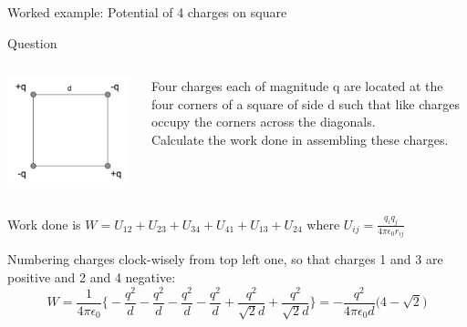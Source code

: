 {
\problemslide

%
%
%

\begin{frame}{Worked example: Potential of 4 charges on square }

\begin{blockexmplque}{Question}
\begin{columns}
  \begin{column}{0.25\textwidth}
   \begin{center}
     \includegraphics[width=0.98\textwidth]{./images/problems/lect2_array_of_4_charges.png}
   \end{center}
  \end{column}
  \begin{column}{0.75\textwidth}
     Four charges each of magnitude q are located at the four corners of a
     square of side d such that like charges occupy the corners across
     the diagonals. \\
    Calculate the work done in assembling these charges.
  \end{column}
\end{columns}
\end{blockexmplque}

\vspace{0.1cm}

Work done is
$\displaystyle W = U_{12} + U_{23} + U_{34} + U_{41} + U_{13} + U_{24}$
where $\displaystyle U_{ij} =  \frac{q_i q_j}{4\pi \epsilon_0 r_{ij}}$

Numbering charges clock-wisely from top left one,
so that charges 1 and 3 are positive and 2 and 4 negative:
\begin{equation*}
  W = \frac{1}{4\pi \epsilon_0}
    \bigg\{
        - \frac{q^2}{d} -  \frac{q^2}{d} -  \frac{q^2}{d} -  \frac{q^2}{d} +  \frac{q^2}{\sqrt{2}d} + \frac{q^2}{\sqrt{2}d}
     \bigg\} =
     -\frac{q^2}{4\pi \epsilon_0 d} \Big( 4 - \sqrt{2} \Big)
\end{equation*}

\end{frame}

} %


